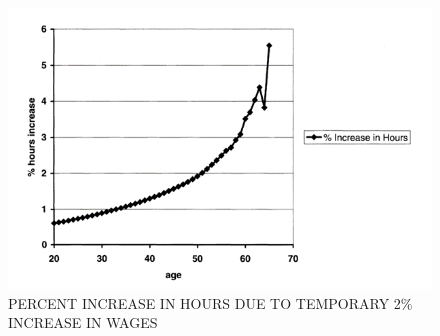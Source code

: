 \hypertarget{TempIncrease}{}
\begin{figure}[tbp]
  \centerline{\includegraphics[width=6in]{../FigDir/Figure8.png}}
  \caption{PERCENT INCREASE IN HOURS DUE TO TEMPORARY 2\% INCREASE IN WAGES}
  \label{fig:TempIncrease}
\end{figure}
